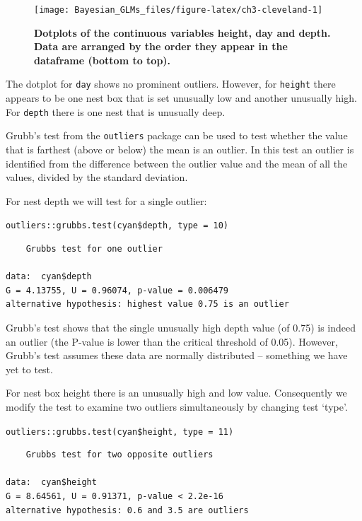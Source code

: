 \documentclass[
]{book}
\begin{document}
\begin{figure}

{\centering \texttt{[image: Bayesian\_GLMs\_files/figure-latex/ch3-cleveland-1]} 

}

\caption{\textbf{Dotplots of the continuous variables height, day and depth. Data are arranged by the order they appear in the dataframe (bottom to top).}}\label{fig:ch3-cleveland}
\end{figure}

The dotplot for \texttt{day} shows no prominent outliers. However, for \texttt{height} there appears to be one nest box that is set unusually low and another unusually high. For \texttt{depth} there is one nest that is unusually deep.

Grubb's test from the \texttt{outliers} package can be used to test whether the value that is farthest (above or below) the mean is an outlier. In this test an outlier is identified from the difference between the outlier value and the mean of all the values, divided by the standard deviation.

For nest depth we will test for a single outlier:

\texttt{outliers::grubbs.test(cyan\$depth,\ type\ =\ 10)}

\begin{verbatim}
    Grubbs test for one outlier

data:  cyan$depth
G = 4.13755, U = 0.96074, p-value = 0.006479
alternative hypothesis: highest value 0.75 is an outlier
\end{verbatim}

Grubb's test shows that the single unusually high depth value (of 0.75) is indeed an outlier (the P-value is lower than the critical threshold of 0.05). However, Grubb's test assumes these data are normally distributed -- something we have yet to test.

For nest box height there is an unusually high and low value. Consequently we modify the test to examine two outliers simultaneously by changing test `type'.

\texttt{outliers::grubbs.test(cyan\$height,\ type\ =\ 11)}

\begin{verbatim}
    Grubbs test for two opposite outliers

data:  cyan$height
G = 8.64561, U = 0.91371, p-value < 2.2e-16
alternative hypothesis: 0.6 and 3.5 are outliers
\end{verbatim}
\end{document}
